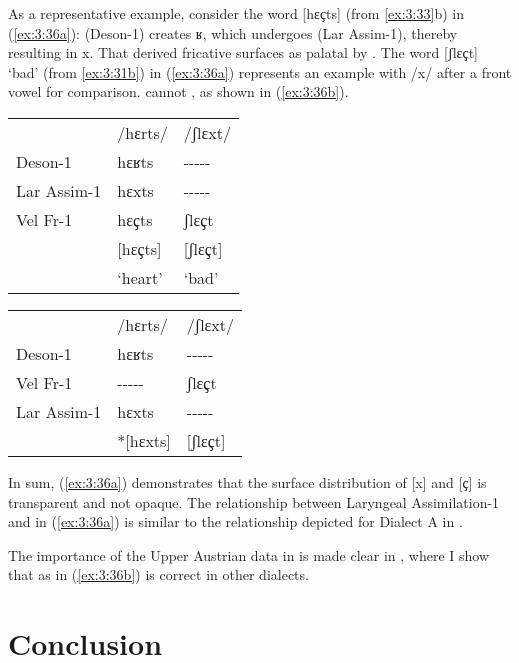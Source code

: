 As a representative example, consider the word [hɛҫts] (from \ref{ex:3:33}b) in (\ref{ex:3:36a}):  (Deson-1) creates {\textbar}{ʁ}{\textbar}, which undergoes  (Lar Assim-1), thereby resulting in {\textbar}x{\textbar}. That derived fricative surfaces as palatal by . The word [{ʃ}l{ɛ}ҫt] ‘bad’ (from \ref{ex:3:31b}) in (\ref{ex:3:36a}) represents an example with /x/ after a front vowel for comparison.  cannot  , as shown in (\ref{ex:3:36b}).

\ea%
\label{ex:3:36}
\ea\label{ex:3:36a} 
\begin{tabular}[t]{@{}lll@{}}    
            &  /hɛrts/  & /ʃlɛxt/       \\  
Deson-1     &  hɛʁts    &  -{}-{}-{}-{}-\\  
Lar Assim-1 &  hɛxts    &  -{}-{}-{}-{}-\\  
Vel Fr-1    &  hɛ{ҫts}  &  ʃlɛ{ҫt}      \\  
            & [hɛ{ҫts]} &  [ʃlɛ{ҫt]}    \\  
            & ‘heart’   &   ‘bad’       \\
\end{tabular}
\ex\label{ex:3:36b}\begin{tabular}[t]{@{}lll@{}}
             & /hɛrts/         &  /ʃlɛxt/      \\
 Deson-1     & hɛʁts           & -{}-{}-{}-{}- \\
 Vel Fr-1    &  -{}-{}-{}-{}-  & ʃlɛ{ҫt}       \\
 Lar Assim-1 &  hɛxts          &  -{}-{}-{}-{}-\\
             & *[hɛxts]        &    [ʃlɛ{ҫt]}  \\
\end{tabular}
\z 
\z 

In sum, (\ref{ex:3:36a}) demonstrates that the surface distribution of [x] and [{ҫ] is transparent and not opaque. The  relationship between Laryngeal As\-sim\-i\-la\-tion-1 and  in (\ref{ex:3:36a}) is similar to the  relationship depicted for Dialect A in .}

The importance of the Upper Austrian data in  is made clear in , where I show that   as in (\ref{ex:3:36b}) is correct in other dialects.


\section{Conclusion}\label{sec:3.7}

